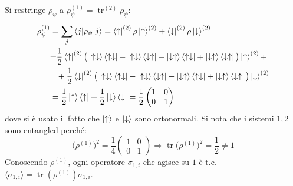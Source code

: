 \documentclass[10pt, a4paper]{scrartcl} %
\numberwithin{equation}{subsection}
\theoremstyle{style2}
\theoremstyle{style1}
\begin{document}
Si restringe $\rho_\psi $ a $\rho _\psi ^{(1)} = \operatorname{tr} ^{(2)} \rho _\psi $:
\begin{equation}
	\begin{split}
		\rho_\psi ^{(1)}  &= \sum_{j}^{} \braket{j|\rho _\psi |j} = \bra{\uparrow} ^{(2)}  \rho \ket{\uparrow} ^{(2)} + \bra{\downarrow} ^{(2)} \rho  \ket{\downarrow} ^{(2)} \\
				  &\begin{split}
					  =&\frac{1}{2} \bra{\uparrow} ^{(2)}  \big(\ket{\uparrow \downarrow} \bra{\uparrow \downarrow} - \ket{\uparrow \downarrow} \bra{\downarrow\uparrow} - \ket{\downarrow\uparrow} \bra{\uparrow\downarrow}  + \ket{\downarrow \uparrow} \bra{\downarrow\uparrow} \big) \ket{\uparrow} ^{(2)} + \\
					   &+ \frac{1}{2} \bra{\downarrow} ^{(2)} \big(\ket{\uparrow \downarrow} \bra{\uparrow \downarrow} - \ket{\uparrow \downarrow} \bra{\downarrow\uparrow} - \ket{\downarrow\uparrow} \bra{\uparrow\downarrow}  + \ket{\downarrow \uparrow} \bra{\downarrow\uparrow} \big) \ket{\downarrow} ^{(2)} 
				  \end{split}\\
				  &= \frac{1}{2} \ket{\uparrow} \bra{\uparrow} + \frac{1}{2} \ket{\downarrow} \bra{\downarrow} = \frac{1}{2} \begin{pmatrix} 1&0\\ 0 &1 \end{pmatrix} 
	\end{split}
\end{equation}
dove si \`e usato il fatto che $\ket{\uparrow} $  e $\ket{\downarrow}  $ sono ortonormali. 
Si nota che i sistemi $1,2$ sono entangled perch\'e:
\[
	\big(\rho ^{(1)} \big)^2 = \frac{1}{4} \begin{pmatrix} 1 & 0 \\ 0 & 1 \end{pmatrix}  \Rightarrow  \operatorname{tr} \big(\rho ^{(1)} \big)^2 = \frac{1}{2} \neq 1
\] 
Conoscendo  $\rho ^{(1)} $, ogni operatore $\sigma _{1,i} $ che agisce su $1$ \`e t.c. $\langle \sigma _{1,i}  \rangle = \operatorname{tr} (\rho ^{(1)  })\sigma _{1,i} $.
\end{document}
